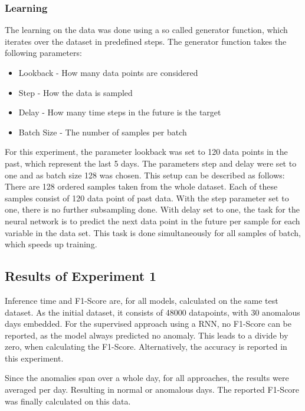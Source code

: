 \subsubsection{Learning}
The learning on the data was done using a so called generator function, which iterates over the dataset in predefined steps. The generator function takes the following parameters:

\begin{itemize}
	\item Lookback - How many data points are considered
	\item Step - How the data is sampled
	\item Delay - How many time steps in the future is the target
	\item Batch Size - The number of samples per batch
\end{itemize}

For this experiment, the parameter lookback was set to 120 data points in the past, which represent the last 5 days. The parameters step and delay were set to one and as batch size 128 was chosen. This setup can be described as follows: There are 128 ordered samples taken from the whole dataset. Each of these samples consist of 120 data point of past data. With the step parameter set to one, there is no further subsampling done. With delay set to one, the task for the neural network is to predict the next data point in the future per sample for each variable in the data set. This task is done simultaneously for all samples of batch, which speeds up training.

\subsection{Results of Experiment 1}

Inference time and F1-Score are, for all models, calculated on the same test dataset. As the initial dataset, it consists of 48000 datapoints, with 30 anomalous days embedded. For the supervised approach using a RNN, no F1-Score can be reported, as the model always predicted no anomaly. This leads to a divide by zero, when calculating the F1-Score. Alternatively, the accuracy is reported in this experiment. 

Since the anomalies span over a whole day, for all approaches, the results were averaged per day. Resulting in normal or anomalous days. The reported F1-Score was finally calculated on this data. 


